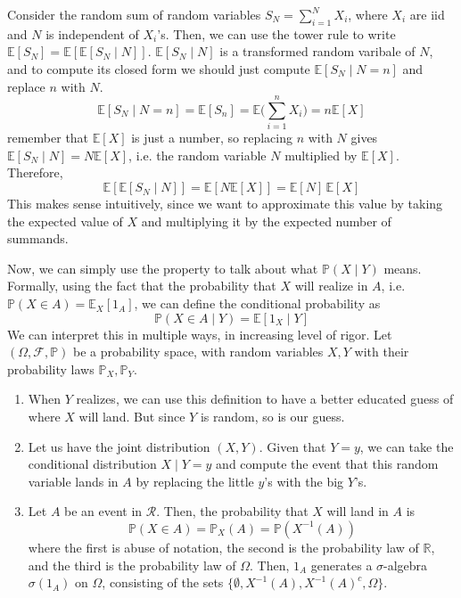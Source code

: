   \begin{example}
    Consider the random sum of random variables $S_N = \sum_{i=1}^N X_i$, where $X_i$ are iid and $N$ is independent of $X_i$'s. Then, we can use the tower rule to write $\mathbb{E}[S_N] = \mathbb{E}[\mathbb{E}[S_N \mid N]]$. $\mathbb{E}[S_N \mid N]$ is a transformed random varibale of $N$, and to compute its closed form we should just compute $\mathbb{E}[S_N \mid N = n]$ and replace $n$ with $N$. 
    \begin{equation}
      \mathbb{E}[S_N \mid N = n] = \mathbb{E}[S_n] = \mathbb{E} \bigg( \sum_{i=1}^n X_i \bigg) = n \mathbb{E}[X]
    \end{equation}
    remember that $\mathbb{E}[X]$ is just a number, so replacing $n$ with $N$ gives $\mathbb{E}[S_N \mid N] = N \mathbb{E}[X]$, i.e. the random variable $N$ multiplied by $\mathbb{E}[X]$. Therefore, 
    \begin{equation}
      \mathbb{E}[\mathbb{E}[S_N \mid N]] = \mathbb{E}[N \mathbb{E}[X]] = \mathbb{E}[N] \, \mathbb{E}[X]
    \end{equation}
    This makes sense intuitively, since we want to approximate this value by taking the expected value of $X$ and multiplying it by the expected number of summands. 
  \end{example}

  Now, we can simply use the property to talk about what $\mathbb{P}(X \mid Y)$ means. Formally, using the fact that the probability that $X$ will realize in $A$, i.e. $\mathbb{P}(X \in A) = \mathbb{E}_X[1_A]$, we can define the conditional probability as 
  \begin{equation}
    \mathbb{P}(X \in A \mid Y) = \mathbb{E}[ 1_X \mid Y]
  \end{equation}
  We can interpret this in multiple ways, in increasing level of rigor. Let $(\Omega, \mathcal{F}, \mathbb{P})$ be a probability space, with random variables $X, Y$ with their probability laws $\mathbb{P}_X, \mathbb{P}_Y$. 
  \begin{enumerate}
    \item When $Y$ realizes, we can use this definition to have a better educated guess of where $X$ will land. But since $Y$ is random, so is our guess. 
    
    \item Let us have the joint distribution $(X, Y)$. Given that $Y = y$, we can take the conditional distribution $X \mid Y = y$ and compute the event that this random variable lands in $A$ by replacing the little $y$'s with the big $Y$'s. 
    
    \item Let $A$ be an event in $\mathcal{R}$. Then, the probability that $X$ will land in $A$ is 
    \begin{equation}
      \mathbb{P}(X \in A) = \mathbb{P}_X(A) = \mathbb{P}(X^{-1} (A))
    \end{equation}
    where the first is abuse of notation, the second is the probability law of $\mathbb{R}$, and the third is the probability law of $\Omega$. Then, $1_A$ generates a $\sigma$-algebra $\sigma(1_A)$ on $\Omega$, consisting of the sets $\{\emptyset, X^{-1}(A), X^{-1}(A)^c, \Omega\}$. 
  \end{enumerate}

